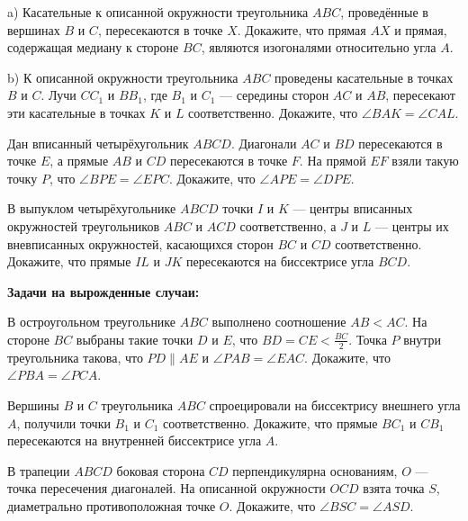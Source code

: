 \documentclass{article}
\begin{document}
\begin{enumerate_boxed}
        \item a) Касательные к описанной окружности треугольника $ABC$, проведённые в вершинах $B$ и $C$, пересекаются в точке $X$.
        Докажите, что прямая $AX$ и прямая, содержащая медиану к стороне $BC$, являются изогоналями относительно угла $A$.

        b) К описанной окружности треугольника $ABC$ проведены касательные в точках $B$ и $C$.
        Лучи $CC_1$ и $BB_1$, где $B_1$ и $C_1$ — середины сторон $AC$ и $AB$, пересекают эти касательные в точках $K$ и $L$ соответственно.
        Докажите, что $\angle BAK=\angle CAL$.

        \item Дан вписанный четырёхугольник $ABCD$.
        Диагонали $AC$ и $BD$ пересекаются в точке $E$, а прямые $AB$ и $CD$ пересекаются в точке $F$.
        На прямой $EF$ взяли такую точку $P$, что $\angle BPE=\angle EPC$.
        Докажите, что $\angle APE=\angle DPE$.

        \item В выпуклом четырёхугольнике $ABCD$ точки $I$ и $K$ — центры вписанных окружностей треугольников $ABC$ и $ACD$ соответственно, а $J$ и $L$ — центры их вневписанных окружностей, касающихся сторон $BC$ и $CD$ соответственно.
        Докажите, что прямые $IL$ и $JK$ пересекаются на биссектрисе угла $BCD$.

        \textbf{Задачи на вырожденные случаи:}

        \item В остроугольном треугольнике \(ABC\) выполнено соотношение \(AB < AC\).
        На стороне \(BC\) выбраны такие точки \(D\) и \(E\), что \(BD = CE < \frac{BC}{2}\).
        Точка \(P\) внутри треугольника такова, что \(PD \parallel AE\) и \(\angle PAB = \angle EAC\).
        Докажите, что \(\angle PBA = \angle PCA\).

        \item Вершины \(B\) и \(C\) треугольника \(ABC\) спроецировали на биссектрису внешнего угла \(A\), получили точки \(B_1\) и \(C_1\) соответственно.
        Докажите, что прямые \(BC_1\) и \(CB_1\) пересекаются на внутренней биссектрисе угла \(A\).

        \item В трапеции \(ABCD\) боковая сторона \(CD\) перпендикулярна основаниям, \(O\) — точка пересечения диагоналей.
        На описанной окружности \(OCD\) взята точка \(S\), диаметрально противоположная точке \(O\).
        Докажите, что \(\angle BSC = \angle ASD\).


\end{enumerate_boxed}
\end{document}
